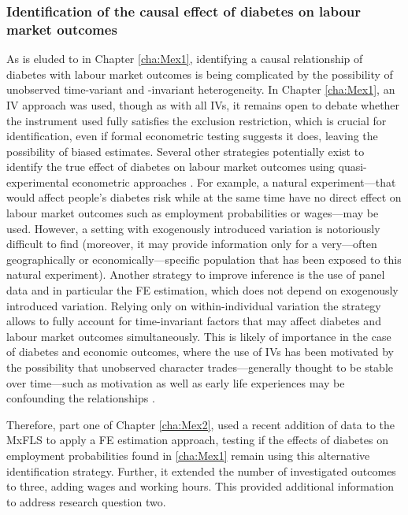 \subsubsection*{Identification of the causal effect of diabetes on labour market outcomes}

As is eluded to in Chapter \ref{cha:Mex1}, identifying a causal relationship of diabetes with labour market outcomes is being complicated by the possibility of unobserved time-variant and -invariant heterogeneity. In Chapter \ref{cha:Mex1}, an \ac{IV} approach was used, though as with all \acp{IV}, it remains open to debate whether the instrument used fully satisfies the exclusion restriction, which is crucial for identification, even if formal econometric testing suggests it does, leaving the possibility of biased estimates. Several other strategies potentially exist to identify the true effect of diabetes on labour market outcomes using quasi-experimental econometric approaches \parencite{Antonakis2012}. For example, a natural experiment---that would affect people's diabetes risk while at the same time have no direct effect on labour market outcomes such as employment probabilities or wages---may be used. However, a setting with exogenously introduced variation is notoriously difficult to find (moreover, it  may provide information only for a very---often geographically or economically---specific population that has been exposed to this natural experiment). Another strategy to improve inference is the use of panel data and in particular the \ac{FE} estimation, which does not depend on exogenously introduced variation. Relying only on within-individual variation the strategy allows to fully account for time-invariant factors that may affect diabetes and labour market outcomes simultaneously. This is likely of importance in the case of diabetes and economic outcomes, where the use of \ac{IV}s has been motivated by the possibility that unobserved character trades---generally thought to be stable over time---such as motivation as well as early life experiences may be confounding the relationships \parencite{Seuring2015}.

Therefore, part one of Chapter \ref{cha:Mex2}, used a recent addition of data to the \ac{MxFLS} to apply a \ac{FE} estimation approach, testing if the effects of diabetes on employment probabilities found in \ref{cha:Mex1} remain using this alternative identification strategy. Further, it extended the number of investigated outcomes to three, adding wages and working hours. This provided additional information to address research question two. 

